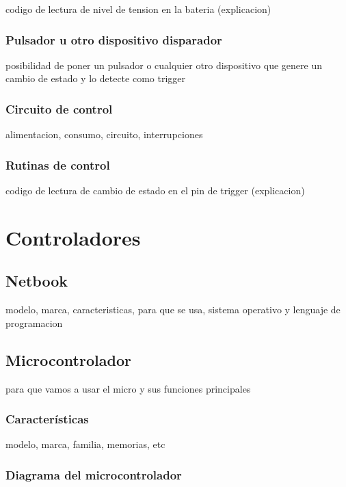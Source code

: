 codigo de lectura de nivel de tension en la bateria (explicacion)

\subsubsection{Pulsador u otro dispositivo disparador}
\label{}

posibilidad de poner un pulsador o cualquier otro dispositivo que genere un cambio de estado y lo detecte como trigger

\subsubsection{Circuito de control}
\label{}

alimentacion, consumo, circuito, interrupciones

\subsubsection{Rutinas de control}
\label{}

codigo de lectura de cambio de estado en el pin de trigger (explicacion)

\section{Controladores}
\label{}

\subsection{Netbook}
\label{}

modelo, marca, caracteristicas, para que se usa, sistema operativo y lenguaje de programacion

\subsection{Microcontrolador}
\label{}

para que vamos a usar el micro y sus funciones principales

\subsubsection{Caracter\'isticas}
\label{}

modelo, marca, familia, memorias, etc

\subsubsection{Diagrama del microcontrolador}
\label{}

